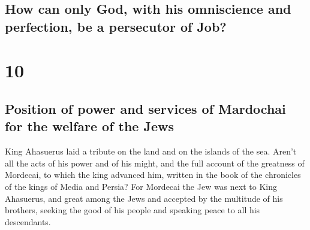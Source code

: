 \begin{paracol}{2}
\begin{otherlanguage}{english}
\hypertarget{how-can-only-god-with-his-omniscience-and-perfection-be-a-persecutor-of-job}{%
\subsection{How can only God, with his omniscience and perfection, be a
persecutor of
Job?}\label{how-can-only-god-with-his-omniscience-and-perfection-be-a-persecutor-of-job}}

\hypertarget{section-19}{%
\section{10}\label{section-19}}

\hypertarget{position-of-power-and-services-of-mardochai-for-the-welfare-of-the-jews}{%
\subsection{Position of power and services of Mardochai for the welfare
of the
Jews}\label{position-of-power-and-services-of-mardochai-for-the-welfare-of-the-jews}}

 King Ahasuerus laid a tribute on the land and on the
islands of the sea.  Aren't all the acts of his power and
of his might, and the full account of the greatness of Mordecai, to
which the king advanced him, written in the book of the chronicles of
the kings of Media and Persia?  For Mordecai the Jew was
next to King Ahasuerus, and great among the Jews and accepted by the
multitude of his brothers, seeking the good of his people and speaking
peace to all his descendants. \end{otherlanguage}
\end{paracol}
